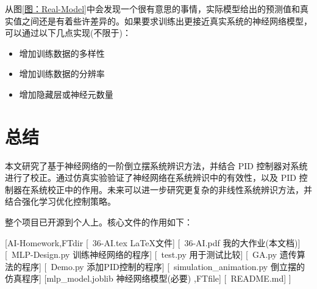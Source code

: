 \documentclass[12pt, AutoFakeBold=4]{ctexart}
\newcommand{\texicon}{{\color{blue}\faFileCode}}
\newcommand{\pdficon}{\color{red}\faFilePdf}
\newcommand{\pyicon}{\color{green}\faPython}
\newcommand{\mdicon}{\color{blue!50!black}\faMarkdown}
\begin{document}
从图\ref{图：Real-Model}中会发现一个很有意思的事情，实际模型给出的预测值和真实值之间还是有着些许差异的。如果要求训练出更接近真实系统的神经网络模型，可以通过以下几点实现(不限于)：
\begin{itemize}
	\item 增加训练数据的多样性
	\item 增加训练数据的分辨率
	\item 增加隐藏层或神经元数量
\end{itemize}

\newpage

	\section{总结}
	本文研究了基于神经网络的一阶倒立摆系统辨识方法，并结合 PID 控制器对系统进行了校正。通过仿真实验验证了神经网络在系统辨识中的有效性，以及 PID 控制器在系统校正中的作用。未来可以进一步研究更复杂的非线性系统辨识方法，并结合强化学习优化控制策略。\par
	整个项目已开源到个人\href{https://github.com/YapengChen1102/AI-Homework}{\color{magenta}{GitHub}}上。核心文件的作用如下：\par

	\begin{ForestDirTree}%
		[font=\sffamily,coliconfolder=yellow!50!pink,iconfiles,coliconfile=teal,vsep=0.5em]%
		{}
		[AI-Homework,FTdir
			[\texicon\ 36-AI.tex\hspace{6cm}	\LaTeX 文件]
			[\pdficon\ 36-AI.pdf\hspace{6cm}	{\normalcolor 我的大作业(本文档)}]
			[\pyicon\ MLP-Design.py\hspace{4.8cm}	{\normalcolor 训练神经网络的程序}]
			[\pyicon\ test.py\hspace{6.4cm}	{\normalcolor 用于测试比较}]
			[\pyicon\ GA.py\hspace{6.4cm}	{\normalcolor 遗传算法的程序}]
			[\pyicon\ Demo.py\hspace{6cm}	{\normalcolor 添加PID控制的程序}]
			[\pyicon\ simulation\_animation.py\hspace{3cm}	{\normalcolor 倒立摆的仿真程序}]
			[mlp\_model.joblib\hspace{4.5cm} {\normalcolor 神经网络模型(必要)} ,FTfile]
			[\mdicon\ README.md]
		]
	\end{ForestDirTree}
	
	
	
\end{document}
